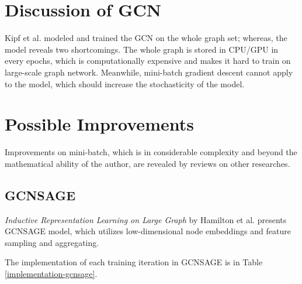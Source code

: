 
\section{Discussion of GCN}

Kipf et al.\cite{DBLP:journals/corr/KipfW16} modeled and trained the GCN on the whole graph set; whereas, the model reveals two shortcomings. The whole graph is stored in CPU/GPU in every epochs, which is computationally expensive and makes it hard to train on large-scale graph network. Meanwhile, mini-batch gradient descent cannot apply to the model, which should increase the stochasticity of the model. 

\section{Possible Improvements}

Improvements on mini-batch, which is in considerable complexity and beyond the mathematical ability of the author, are revealed by reviews on other researches.

\subsection{GCNSAGE}

\textit{Inductive Representation Learning on Large Graph} by Hamilton et al.\cite{DBLP:journals/corr/HamiltonYL17} presents GCNSAGE model, which utilizes low-dimensional node embeddings and feature sampling and aggregating. 

The implementation of each training iteration in GCNSAGE is in Table \ref{implementation-gcnsage}.

